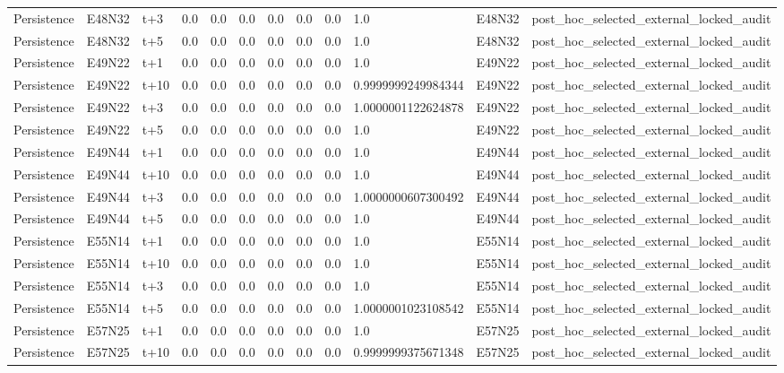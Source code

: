 \begin{landscape}
\begin{longtable}{llllllllllll}
Persistence & E48N32 & t+3 & 0.0 & 0.0 & 0.0 & 0.0 & 0.0 & 0.0 & 1.0 & E48N32 & post\_hoc\_selected\_external\_locked\_audit \\
Persistence & E48N32 & t+5 & 0.0 & 0.0 & 0.0 & 0.0 & 0.0 & 0.0 & 1.0 & E48N32 & post\_hoc\_selected\_external\_locked\_audit \\
Persistence & E49N22 & t+1 & 0.0 & 0.0 & 0.0 & 0.0 & 0.0 & 0.0 & 1.0 & E49N22 & post\_hoc\_selected\_external\_locked\_audit \\
Persistence & E49N22 & t+10 & 0.0 & 0.0 & 0.0 & 0.0 & 0.0 & 0.0 & 0.9999999249984344 & E49N22 & post\_hoc\_selected\_external\_locked\_audit \\
Persistence & E49N22 & t+3 & 0.0 & 0.0 & 0.0 & 0.0 & 0.0 & 0.0 & 1.0000001122624878 & E49N22 & post\_hoc\_selected\_external\_locked\_audit \\
Persistence & E49N22 & t+5 & 0.0 & 0.0 & 0.0 & 0.0 & 0.0 & 0.0 & 1.0 & E49N22 & post\_hoc\_selected\_external\_locked\_audit \\
Persistence & E49N44 & t+1 & 0.0 & 0.0 & 0.0 & 0.0 & 0.0 & 0.0 & 1.0 & E49N44 & post\_hoc\_selected\_external\_locked\_audit \\
Persistence & E49N44 & t+10 & 0.0 & 0.0 & 0.0 & 0.0 & 0.0 & 0.0 & 1.0 & E49N44 & post\_hoc\_selected\_external\_locked\_audit \\
Persistence & E49N44 & t+3 & 0.0 & 0.0 & 0.0 & 0.0 & 0.0 & 0.0 & 1.0000000607300492 & E49N44 & post\_hoc\_selected\_external\_locked\_audit \\
Persistence & E49N44 & t+5 & 0.0 & 0.0 & 0.0 & 0.0 & 0.0 & 0.0 & 1.0 & E49N44 & post\_hoc\_selected\_external\_locked\_audit \\
Persistence & E55N14 & t+1 & 0.0 & 0.0 & 0.0 & 0.0 & 0.0 & 0.0 & 1.0 & E55N14 & post\_hoc\_selected\_external\_locked\_audit \\
Persistence & E55N14 & t+10 & 0.0 & 0.0 & 0.0 & 0.0 & 0.0 & 0.0 & 1.0 & E55N14 & post\_hoc\_selected\_external\_locked\_audit \\
Persistence & E55N14 & t+3 & 0.0 & 0.0 & 0.0 & 0.0 & 0.0 & 0.0 & 1.0 & E55N14 & post\_hoc\_selected\_external\_locked\_audit \\
Persistence & E55N14 & t+5 & 0.0 & 0.0 & 0.0 & 0.0 & 0.0 & 0.0 & 1.0000001023108542 & E55N14 & post\_hoc\_selected\_external\_locked\_audit \\
Persistence & E57N25 & t+1 & 0.0 & 0.0 & 0.0 & 0.0 & 0.0 & 0.0 & 1.0 & E57N25 & post\_hoc\_selected\_external\_locked\_audit \\
Persistence & E57N25 & t+10 & 0.0 & 0.0 & 0.0 & 0.0 & 0.0 & 0.0 & 0.9999999375671348 & E57N25 & post\_hoc\_selected\_external\_locked\_audit \\

\end{longtable}
\end{landscape}
